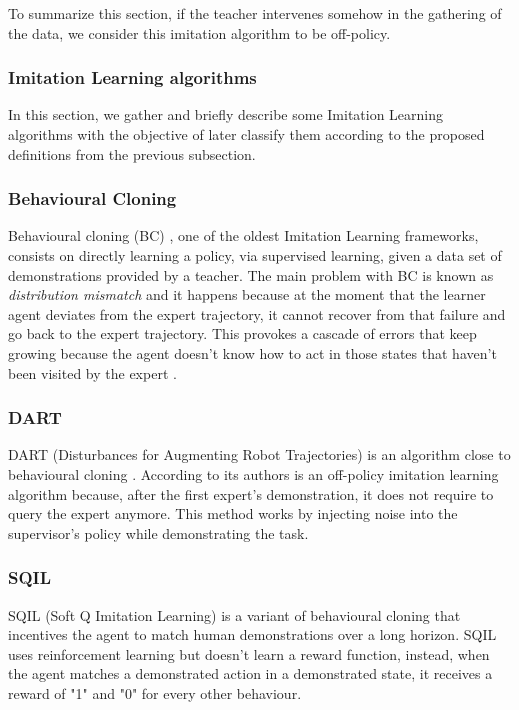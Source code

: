 To summarize this section, if the teacher intervenes somehow  in the gathering of the data, we consider this imitation algorithm to be off-policy.

\subsubsection{Imitation Learning algorithms}
\label{subsubsection:Imitation Learning algorithms}

In this section, we gather and briefly describe some Imitation Learning algorithms with the objective of later classify them according to the proposed definitions from the previous subsection.




\subsubsection*{Behavioural Cloning}
Behavioural cloning (BC) \cite{Behavioural-Cloning-Pomerleau:1991}, one of the oldest Imitation Learning frameworks, consists on directly learning a policy, via supervised learning, given a data set of demonstrations provided by a teacher. The main problem with BC is known as \textit{distribution mismatch} and it happens because at the moment that the learner agent deviates from the expert trajectory, it cannot recover from that failure and go back to the expert trajectory. This provokes a cascade of errors that keep growing because the agent doesn't know how to act in those states that haven't been visited by the expert \cite{Global-overview-Attia:2018}.

\subsubsection*{DART}
DART (Disturbances for Augmenting Robot Trajectories) \cite{DART-Laskey:2017} is an algorithm close to behavioural cloning \cite{Behavioural-Cloning-Pomerleau:1991}. According to its authors is an off-policy imitation learning algorithm because, after the first expert's demonstration, it does not require to query the expert anymore. This method works by injecting noise into the supervisor's policy while demonstrating the task.

\subsubsection*{SQIL}
SQIL (Soft Q Imitation Learning) \cite{SQIL-Reddy-Dragan-Levine:2019} is a variant of behavioural cloning that incentives the agent to match human demonstrations over a long horizon. SQIL uses reinforcement learning but doesn't learn a reward function, instead, when the agent matches a demonstrated action in a demonstrated state, it receives a reward of "1" and "0" for every other behaviour.

